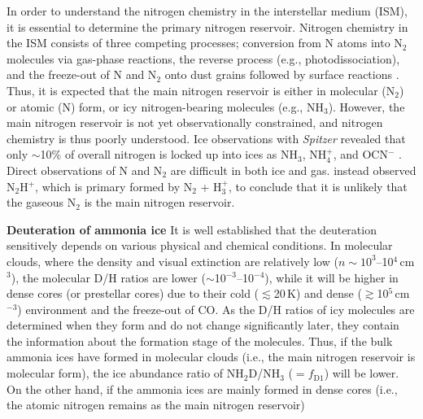 \documentclass[12pt,a4paper]{article}  %
\newcommand{\ammonia}{NH$_3$\xspace}
\begin{document}
\smallskip
\noindent In order to understand the nitrogen chemistry in the interstellar medium (ISM), it is essential to determine the primary nitrogen reservoir. Nitrogen chemistry in the ISM consists of three competing processes; conversion from N atoms into N$_2$ molecules via gas-phase reactions, the reverse process (e.g., photodissociation), and the freeze-out of N and N$_2$ onto dust grains followed by surface reactions \citep[e.g.,][]{Daranlot12}. Thus, it is expected that the main nitrogen reservoir is either in molecular (N$_2$) or atomic (N) form, or icy nitrogen-bearing molecules (e.g., \ammonia). However, the main nitrogen reservoir is not yet observationally constrained, and nitrogen chemistry is thus poorly understood. Ice observations with \textit{Spitzer} revealed that only $\sim$10\% of overall nitrogen is locked up into ices as \ammonia, NH$_4^+$, and OCN$^-$ \citep{Oberg11}. Direct observations of N and N$_2$ are difficult in both ice and gas. \citet{Maret06} instead observed N$_2$H$^+$, which is primary formed by N$_2$ + H$_3^+$, to conclude that it is unlikely that the gaseous N$_2$ is the main nitrogen reservoir. %

\medskip
\noindent \textbf{Deuteration of ammonia ice} \quad  %
It is well established that the deuteration sensitively depends on various physical and chemical conditions. In  molecular clouds, where the density and visual extinction are relatively low ($n\sim10^{3}$--10$^{4}$\,cm$^3$), the molecular D/H ratios are lower ($\sim$10$^{-3}$--10$^{-4}$), while it will be higher in dense cores (or prestellar cores) due to their cold ($\lesssim$20\,K) and dense ($\gtrsim$10$^5$\,cm$^{-3}$) environment and the freeze-out of CO. As the D/H ratios of icy molecules are determined when they form and do not change significantly later, they contain the information about the formation stage of the molecules. Thus, if the bulk ammonia ices have formed in molecular clouds (i.e., the main nitrogen reservoir is molecular form), the ice abundance ratio of NH$_2$D/NH$_3$ ($=f_\mathrm{D1}$) will be lower. On the other hand, if the ammonia ices are mainly formed in dense cores (i.e., the atomic nitrogen remains as the main nitrogen reservoir) 
\end{document}
